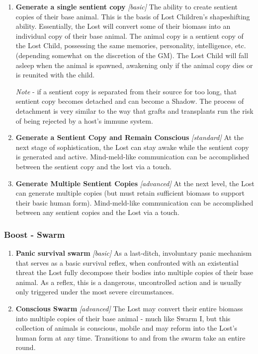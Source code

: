\documentclass[letterpaper,serif]{rpg-module}
\begin{document}
\begin{enumerate}
    \item \textbf{Generate a single sentient copy} \textit{[basic]} The ability to create sentient copies of their base animal. This is the basis of Lost Children's shapeshifting ability. Essentially, the Lost will convert some of their biomass into an individual copy of their base animal. The animal copy is a sentient copy of the Lost Child, possessing the same memories, personality, intelligence, etc. (depending somewhat on the discretion of the GM). The Lost Child will fall asleep when the animal is spawned, awakening only if the animal copy dies or is reunited with the child. 
    
    \textit{Note} - if a sentient copy is separated from their source for too long, that sentient copy becomes detached and can become a Shadow. The process of detachment is very similar to the way that grafts and transplants run the risk of being rejected by a host's immune system.
    \item \textbf{Generate a Sentient Copy and Remain Conscious} \textit{[standard]} At the next stage of sophistication, the Lost can stay awake while the sentient copy is generated and active. Mind-meld-like communication can be accomplished between the sentient copy and the lost via a touch. 
    \item \textbf{Generate Multiple Sentient Copies} \textit{[advanced]} At the next level, the Lost can generate multiple copies (but must retain sufficient biomass to support their basic human form). Mind-meld-like communication can be accomplished between any sentient copies and the Lost via a touch. 
\end{enumerate}

\subsubsection{Boost - Swarm}
\begin{enumerate}
    \item \textbf{Panic survival swarm} \textit{[basic]}
As a last-ditch, involuntary panic mechanism that serves as a basic survival reflex, when confronted with an existential threat the Lost fully decompose their bodies into multiple copies of their base animal. As a reflex, this is a dangerous, uncontrolled action and is usually only triggered under the most severe circumstances. 
    \item \textbf{Conscious Swarm} \textit{[advanced]}
The Lost may convert their entire biomass into multiple copies of their base animal - much like Swarm I, but this collection of animals is conscious, mobile and may reform into the Lost's human form at any time. Transitions to and from the swarm take an entire round.
\end{enumerate}
\end{document}
